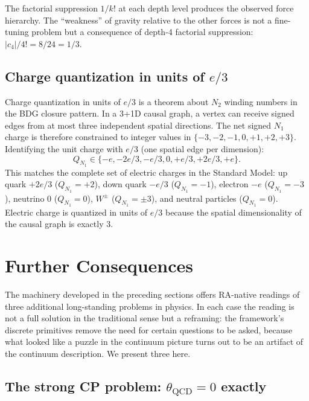 \documentclass[11pt]{article}
\begin{document}
The factorial suppression $1/k!$ at each depth level produces the observed force hierarchy. The ``weakness'' of gravity relative to the other forces is not a fine-tuning problem but a consequence of depth-4 factorial suppression: $|c_4|/4!=8/24=1/3$.

\subsection{Charge quantization in units of $e/3$}

Charge quantization in units of $e/3$ is a theorem about $N_2$ winding numbers in the BDG closure pattern. In a 3+1D causal graph, a vertex can receive signed edges from at most three independent spatial directions. The net signed $N_1$ charge is therefore constrained to integer values in $\{-3,-2,-1,0,+1,+2,+3\}$. Identifying the unit charge with $e/3$ (one spatial edge per dimension):
\begin{equation}
Q_{N_1}\in\{-e,-2e/3,-e/3,0,+e/3,+2e/3,+e\}.
\end{equation}
This matches the complete set of electric charges in the Standard Model: up quark $+2e/3$ ($Q_{N_1}=+2$), down quark $-e/3$ ($Q_{N_1}=-1$), electron $-e$ ($Q_{N_1}=-3$), neutrino $0$ ($Q_{N_1}=0$), $W^\pm$ ($Q_{N_1}=\pm 3$), and neutral particles ($Q_{N_1}=0$). Electric charge is quantized in units of $e/3$ because the spatial dimensionality of the causal graph is exactly 3.

\section{Further Consequences}
\label{sec:consequences}

The machinery developed in the preceding sections offers RA-native readings of three additional long-standing problems in physics. In each case the reading is not a full solution in the traditional sense but a reframing: the framework's discrete primitives remove the need for certain questions to be asked, because what looked like a puzzle in the continuum picture turns out to be an artifact of the continuum description. We present three here.

\subsection{The strong CP problem: $\theta_{\mathrm{QCD}}=0$ exactly}
\end{document}
